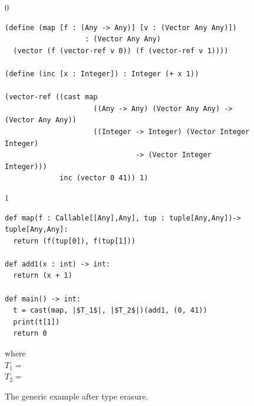 \documentclass[7x10]{TimesAPriori_MIT}%
\def\racketEd{0}
\def\pythonEd{1}
\def\edition{1}
\newcommand{\pythonColor}[0]{}
\numberwithin{theorem}{chapter}
\numberwithin{definition}{chapter}
\numberwithin{equation}{chapter}
\begin{document}
\begin{figure}[tbp]
\begin{tcolorbox}[colback=white]  
{\if\edition\racketEd    
\begin{lstlisting}
(define (map [f : (Any -> Any)] [v : (Vector Any Any)])
                   : (Vector Any Any)
  (vector (f (vector-ref v 0)) (f (vector-ref v 1))))

(define (inc [x : Integer]) : Integer (+ x 1))

(vector-ref ((cast map
                     ((Any -> Any) (Vector Any Any) -> (Vector Any Any))  
                     ((Integer -> Integer) (Vector Integer Integer)
                               -> (Vector Integer Integer)))
             inc (vector 0 41)) 1)
\end{lstlisting}
\fi}
{\if\edition\pythonEd\pythonColor
\begin{lstlisting}
def map(f : Callable[[Any],Any], tup : tuple[Any,Any])-> tuple[Any,Any]:
  return (f(tup[0]), f(tup[1]))

def add1(x : int) -> int:
  return (x + 1)

def main() -> int:
  t = cast(map, |$T_1$|, |$T_2$|)(add1, (0, 41))
  print(t[1])
  return 0
\end{lstlisting}
{\small
where\\
$T_1 = $ \\
$T_2 = $ 
}
\fi}
\end{tcolorbox}

\caption{The generic  example after type erasure.}
\label{fig:map-erase}
\end{figure}
\end{document}
